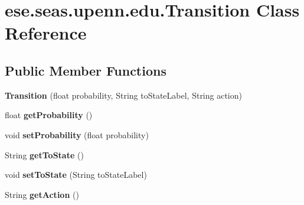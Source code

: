 \hypertarget{classese_1_1seas_1_1upenn_1_1edu_1_1_transition}{}\section{ese.\+seas.\+upenn.\+edu.\+Transition Class Reference}
\label{classese_1_1seas_1_1upenn_1_1edu_1_1_transition}
\subsection*{Public Member Functions}
\begin{DoxyCompactItemize}
\item 
\hypertarget{classese_1_1seas_1_1upenn_1_1edu_1_1_transition_ae400900946cce4a3eed16807cc4c4aac}{}{\bfseries Transition} (float probability, String to\+State\+Label, String action)\label{classese_1_1seas_1_1upenn_1_1edu_1_1_transition_ae400900946cce4a3eed16807cc4c4aac}

\item 
\hypertarget{classese_1_1seas_1_1upenn_1_1edu_1_1_transition_a76913b9db35b0d64278d511489ce2361}{}float {\bfseries get\+Probability} ()\label{classese_1_1seas_1_1upenn_1_1edu_1_1_transition_a76913b9db35b0d64278d511489ce2361}

\item 
\hypertarget{classese_1_1seas_1_1upenn_1_1edu_1_1_transition_aad1a0ce12182468aceac85ea0262e0ba}{}void {\bfseries set\+Probability} (float probability)\label{classese_1_1seas_1_1upenn_1_1edu_1_1_transition_aad1a0ce12182468aceac85ea0262e0ba}

\item 
\hypertarget{classese_1_1seas_1_1upenn_1_1edu_1_1_transition_a8adc065ffa3b2d59144f3e1bc5334159}{}String {\bfseries get\+To\+State} ()\label{classese_1_1seas_1_1upenn_1_1edu_1_1_transition_a8adc065ffa3b2d59144f3e1bc5334159}

\item 
\hypertarget{classese_1_1seas_1_1upenn_1_1edu_1_1_transition_a709ce1be87d6954becff885bfea20dea}{}void {\bfseries set\+To\+State} (String to\+State\+Label)\label{classese_1_1seas_1_1upenn_1_1edu_1_1_transition_a709ce1be87d6954becff885bfea20dea}

\item 
\hypertarget{classese_1_1seas_1_1upenn_1_1edu_1_1_transition_a1cbeb959023673cae243d638c0434844}{}String {\bfseries get\+Action} ()\label{classese_1_1seas_1_1upenn_1_1edu_1_1_transition_a1cbeb959023673cae243d638c0434844}


\end{DoxyCompactItemize}
